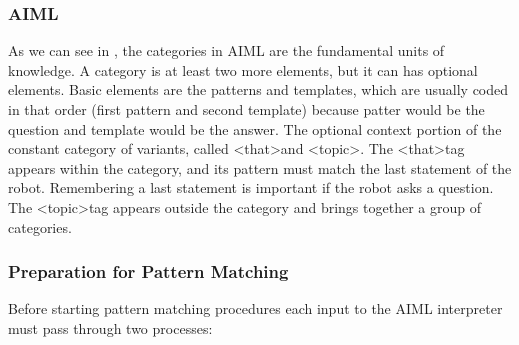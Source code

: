 \documentclass[12pt,twoside]{article}
\theoremstyle{plain}
\theoremstyle{definition}
\theoremstyle{remark}
\begin{document}
\subsubsection{AIML}

	
	As we can see in \cite{wallace2003elements}, the categories in AIML are the fundamental units of knowledge. A category is at least two more elements, but it can has optional elements. Basic elements are the patterns and templates, which are usually coded in that order (first pattern and second template) because patter would be the question and template would be the answer. The optional context portion of the constant category of variants, called \textless that\textgreater and \textless topic\textgreater. The \textless that\textgreater tag appears within the category, and its pattern must match the last statement of the robot. Remembering a last statement is important if the robot asks a question. The \textless topic\textgreater tag appears outside the category and brings together a group of categories. 
	

	
\subsubsection{Preparation for Pattern Matching}
	\label{sec:preparation}	
	
	Before starting pattern matching procedures each input to the AIML interpreter must pass through two processes:\\
	
\end{document}
